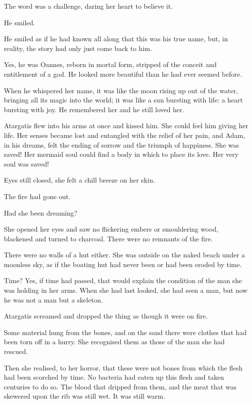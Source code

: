 The word was a challenge, daring her heart to believe it.

He smiled.

He smiled as if he had known all along that this was his true name,
but, in reality, the story had only just come back to him.

Yes, he was Oannes, reborn in mortal form, stripped of the conceit and
entitlement of a god.  He looked more beautiful than he had ever
seemed before.

When he whispered her name, it was like the moon rising up out of the
water, bringing all its magic into the world; it was like a sun
bursting with life: a heart bursting with joy. He remembered her and
he still loved her.

Atargatis flew into his arms at once and kissed him. She could feel
him giving her life. Her senses became lost and entangled with the
relief of her pain, and Adam, in his dreams, felt the ending of sorrow
and the triumph of happiness. She was saved! Her mermaid soul could
find a body in which to place its love. Her very soul was saved!

Eyes still closed, she felt a chill breeze on her skin.

The fire had gone out.

Had she been dreaming?

She opened her eyes and saw no flickering embers or smouldering wood,
blackened and turned to charcoal. There were no remnants of the fire.

There were no walls of a hut either. She was outside on the naked
beach under a moonless sky, as if the boating hut had never been or
had been eroded by time.

Time? Yes, if time had passed, that would explain the condition of the
man she was holding in her arms. When she had last looked, she had
seen a man, but now he was not a man but a skeleton.

Atargatis screamed and dropped the thing as though it were on fire.

Some material hung from the bones, and on the sand there were clothes
that had been torn off in a hurry. She recognised them as those of the
man she had rescued.

Then she realised, to her horror, that these were not bones from which
the flesh had been scorched by time. No bacteria had eaten up this
flesh and taken centuries to do so. The blood that dripped from them,
and the meat that was skewered upon the rib was still wet. It was
still warm.

